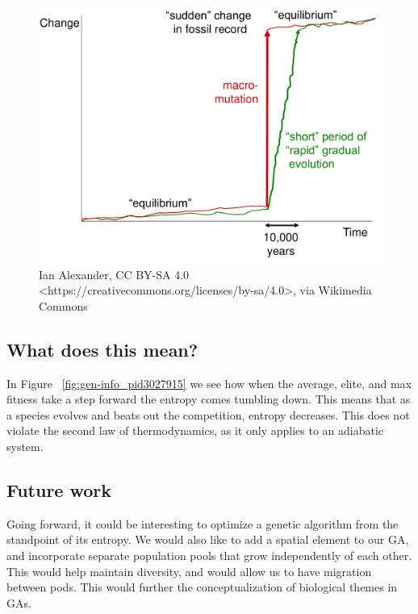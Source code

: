 \documentclass[11pt]{article}
\begin{document}
\begin{figure}[t]
	\begin{center}
	\includegraphics[scale=0.25]{Punctuated_Equilibrium.pdf}
	\caption{ \small Ian Alexander, CC BY-SA 4.0
          <https://creativecommons.org/licenses/by-sa/4.0>, via
          Wikimedia Commons }
      \label{fig:punctuated-equilibrium}
\end{center}
\end{figure}

\subsection{What does this mean?}
\label{sec😮rgf7b36ed}

In Figure ~\ref{fig:gen-info_pid3027915} we see how when the average, elite, and max fitness take a
step forward the entropy comes tumbling down. This means that as a
species evolves and beats out
the competition, entropy decreases. This does not violate the second
law of thermodynamics, as it only applies to an adiabatic
system.

\subsection{Future work}
\label{sec:org0f04af1}

Going forward, it could be interesting to optimize a genetic algorithm
from the standpoint of its entropy. We would also like to add a spatial 
element to our GA, and incorporate separate population pools that grow 
independently of each other. This would help maintain diversity, and 
would allow us to have migration between pods. This would further 
the conceptualization of biological themes in GAs.
\end{document}
